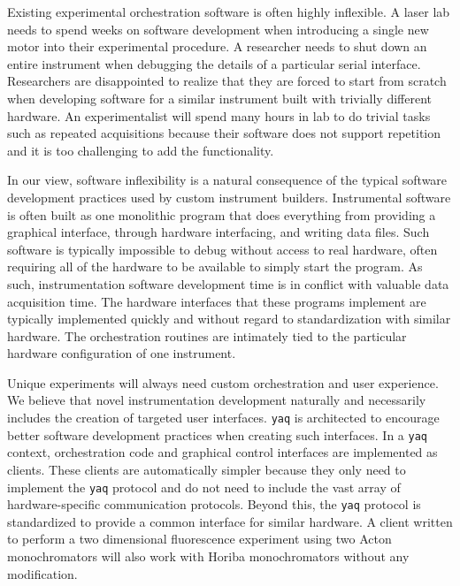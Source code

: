 \documentclass[aip, amsmath, amssymb, reprint,]{revtex4-1}
\newcommand\yaq{\texttt{yaq}}
\begin{document}
Existing experimental orchestration software is often highly inflexible.
A laser lab needs to spend weeks on software development when introducing a single new motor into their experimental procedure.
A researcher needs to shut down an entire instrument when debugging the details of a particular serial interface.
Researchers are disappointed to realize that they are forced to start from scratch when developing software for a similar instrument built with trivially different hardware.
An experimentalist will spend many hours in lab to do trivial tasks such as repeated acquisitions because their software does not support repetition and it is too challenging to add the functionality.

In our view, software inflexibility is a natural consequence of the typical software development practices used by custom instrument builders.
Instrumental software is often built as one monolithic program that does everything from providing a graphical interface, through hardware interfacing, and writing data files.
Such software is typically impossible to debug without access to real hardware, often requiring all of the hardware to be available to simply start the program.
As such, instrumentation software development time is in conflict with valuable data acquisition time.
The hardware interfaces that these programs implement are typically implemented quickly and without regard to standardization with similar hardware.
The orchestration routines are intimately tied to the particular hardware configuration of one instrument.


Unique experiments will always need custom orchestration and user experience.
We believe that novel instrumentation development naturally and necessarily includes the creation of targeted user interfaces.
\yaq{} is architected to encourage better software development practices when creating such interfaces.
In a \yaq{} context, orchestration code and graphical control interfaces are implemented as clients.
These clients are automatically simpler because they only need to implement the \yaq{} protocol and do not need to include the vast array of hardware-specific communication protocols.
Beyond this, the \yaq{} protocol is standardized to provide a common interface for similar hardware.
A client written to perform a two dimensional fluorescence experiment using two Acton monochromators will also work with Horiba monochromators without any modification.
\end{document}
